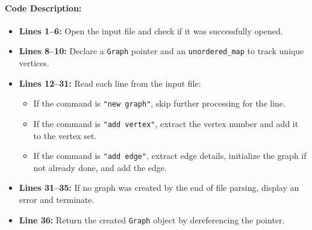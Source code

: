 \documentclass[a4paper,12pt]{article}
\begin{document}
\paragraph{Code Description:}
\begin{itemize}
    \item \textbf{Lines 1--6:} Open the input file and check if it was successfully opened.
    \item \textbf{Lines 8--10:} Declare a \texttt{Graph} pointer and an \texttt{unordered\_map} to track unique vertices.
    \item \textbf{Lines 12--31:} Read each line from the input file:
        \begin{itemize}
            \item If the command is \texttt{"new graph"}, skip further processing for the line.
            \item If the command is \texttt{"add vertex"}, extract the vertex number and add it to the vertex set.
            \item If the command is \texttt{"add edge"}, extract edge details, initialize the graph if not already done, and add the edge.
        \end{itemize}
    \item \textbf{Lines 31--35:} If no graph was created by the end of file parsing, display an error and terminate.
    \item \textbf{Line 36:} Return the created \texttt{Graph} object by dereferencing the pointer.
\end{itemize}
\end{document}
